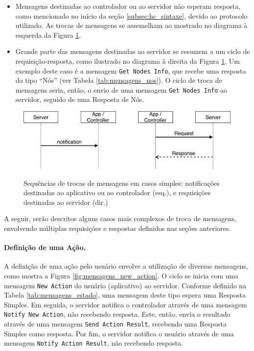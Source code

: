 \begin{itemize}
	\item Mensagens destinadas ao controlador ou ao servidor não esperam resposta, como mencionado no início da seção \ref{subsec:hc_sintaxe}, devido ao protocolo utilizado. As trocas de mensagens se assemelham ao mostrado no diagrama à esquerda da Figura \ref{fig:mensagens_simples}.
	\item Grande parte das mensagens destinadas ao servidor se resumem a um ciclo de requisição-resposta, como ilustrado no diagrama à direita da Figura \ref{fig:mensagens_simples}. Um exemplo deste caso é a mensagem \texttt{Get Nodes Info}, que recebe uma resposta do tipo ``Nós'' (ver Tabela \ref{tab:mensagens_nos}). O ciclo de troca de mensagens seria, então, o envio de uma mensagem \texttt{Get Nodes Info} ao servidor, seguido de uma Resposta de Nós.
\end{itemize}

\begin{figure}[h]
	\centering
	\caption{Sequências de trocas de mensagens em casos simples: notificações destinadas ao aplicativo ou ao controlador (esq.), e requisições destinadas ao servidor (dir.)}
  \includegraphics[width=\textwidth]{imagens/mensagens_simples.pdf}
  \label{fig:mensagens_simples}  
\end{figure}

A seguir, serão descritos alguns casos mais complexos de troca de mensagens, envolvendo múltiplas requisições e respostas definidos nas seções anteriores.

\paragraph*{Definição de uma Ação.}
A definição de uma ação pelo usuário envolve a utilização de diversas mensagens, como mostra a Figura \ref{fig:mensagens_new_action}. O ciclo se inicia com uma mensagem \texttt{New Action} do usuário (aplicativo) ao servidor. Conforme definido na Tabela \ref{tab:mensagens_estado}, uma mensagem deste tipo espera uma Resposta Simples. Em seguida, o servidor notifica o controlador através de uma mensagem \texttt{Notify New Action}, não recebendo resposta. Este, então, envia o resultado através de uma mensagem \texttt{Send Action Result}, recebendo uma Resposta Simples como resposta. Por fim, o servidor notifica o usuário através de uma mensagem \texttt{Notify Action Result}, não recebendo resposta.

